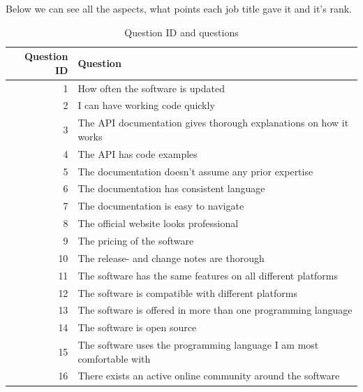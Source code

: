 \documentclass{article}
\begin{document}
Below we can see all the aspects, what points each job title gave it and
it's rank.

\begin{table}[H]
\centering
\begin{tabular}{r|l}
\textbf{Question ID} & \textbf{Question} \\ \hline
1 & How often the software is updated                                         \\
2 & I can have working code quickly                                           \\
3 & The API documentation gives thorough explanations on how it works         \\
4 & The API has code examples                                                 \\
5 & The documentation doesn't assume any prior expertise                      \\
6 & The documentation has consistent language                                 \\
7 & The documentation is easy to navigate                                         \\
8   & The official website looks professional\\
9 & The pricing of the software\\
10 & The release- and change notes are thorough\\
11 & The software has the same features on all different platforms\\
12 & The software is compatible with different platforms\\
13 & The software is offered in more than one programming language\\
14 & The software is open source\\
15  & The software uses the programming language I am most comfortable with\\
16 & There exists an active online community around the software\\ \hline
\end{tabular}
\caption{Question ID and questions}
\label{tab:questionID}
\end{table}
\end{document}
